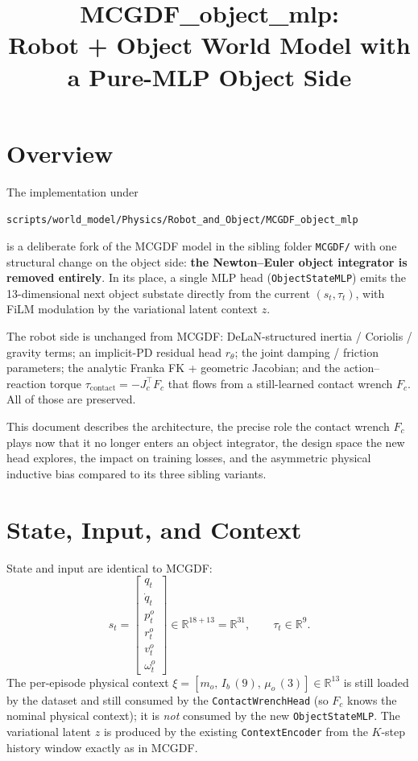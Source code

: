 \documentclass[11pt]{article}
\title{MCGDF\_object\_mlp:\\Robot + Object World Model with a Pure-MLP Object Side}
\author{}
\date{}
\begin{document}
\maketitle

\section{Overview}

The implementation under
\begin{center}
\texttt{scripts/world\_model/Physics/Robot\_and\_Object/MCGDF\_object\_mlp}
\end{center}
is a deliberate fork of the MCGDF model in the sibling folder
\texttt{MCGDF/} with one structural change on the object side:
\textbf{the Newton--Euler object integrator is removed entirely}.  In
its place, a single MLP head (\texttt{ObjectStateMLP}) emits the
13-dimensional next object substate directly from the current
$(s_t, \tau_t)$, with FiLM modulation by the variational latent
context $z$.

The robot side is unchanged from MCGDF: DeLaN-structured inertia /
Coriolis / gravity terms; an implicit-PD residual head $r_\theta$; the
joint damping / friction parameters; the analytic Franka FK +
geometric Jacobian; and the action--reaction torque
$\tau_{\mathrm{contact}} = -J_c^\top F_c$ that flows from a
still-learned contact wrench $F_c$.  All of those are preserved.

This document describes the architecture, the precise role the
contact wrench $F_c$ plays now that it no longer enters an object
integrator, the design space the new head explores, the impact on
training losses, and the asymmetric physical inductive bias compared
to its three sibling variants.

\section{State, Input, and Context}

State and input are identical to MCGDF:
\begin{equation}
  s_t =
  \begin{bmatrix}
    q_t \\ \dot q_t \\ p^o_t \\ r^o_t \\ v^o_t \\ \omega^o_t
  \end{bmatrix} \in \mathbb{R}^{18 + 13} = \mathbb{R}^{31},
  \qquad
  \tau_t \in \mathbb{R}^{9}.
\end{equation}
The per-episode physical context $\xi = [m_o,\,I_b\,\mathrm{(9)},\,
\mu_o\,(3)] \in \mathbb{R}^{13}$ is still loaded by the dataset and
still consumed by the \texttt{ContactWrenchHead} (so $F_c$ knows the
nominal physical context); it is \emph{not} consumed by the new
\texttt{ObjectStateMLP}.  The variational latent $z$ is produced by
the existing \texttt{ContextEncoder} from the $K$-step history window
exactly as in MCGDF.
\end{document}
